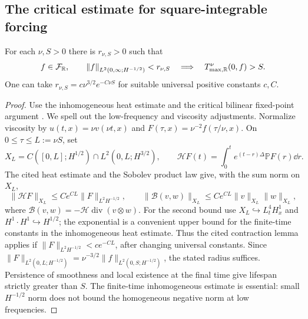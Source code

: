 \subsection{The critical estimate for square-integrable forcing}
\begin{proposition}\label{prop:Rcritical2}
For each $\nu,S>0$ there is $r_{\nu,S}>0$ such that
\[
 f\in\mathcal F_{\mathbb R},\qquad
 \left\lVert f\right\rVert_{L^2(0,\infty;H^{-1/2})}<r_{\nu,S}
 \quad\Longrightarrow\quad T^\nu_{\max,\mathbb R}(0,f)>S.
\]
One can take $r_{\nu,S}=c\nu^{3/2}e^{-C\nu S}$ for suitable universal positive constants $c,C$.
\end{proposition}
\begin{proof}
Use the inhomogeneous heat estimate
\cite[Theorem~2.2.5, p.~44]{danchin} and the critical bilinear fixed-point
argument \cite[Lemma~2.3.2 and the proof of Theorem~2.3.1, pp.~48--49]{danchin}.
We spell out the low-frequency and viscosity adjustments. Normalize viscosity
by $u(t,x)=\nu v(\nu t,x)$ and $F(\tau,x)=\nu^{-2}f(\tau/\nu,x)$.
On $0\le\tau\le L:=\nu S$, set
\[
 X_L=C([0,L];H^{1/2})\cap L^2(0,L;H^{3/2}),
 \qquad
 \mathcal H F(t)=\int_0^t e^{(t-r)\Delta}\mathbb P F(r)\dd r.
\]
The cited heat estimate and the Sobolev product law give, with the sum norm
on $X_L$,
\[
 \|\mathcal H F\|_{X_L}\le Ce^{CL}\|F\|_{L^2H^{-1/2}},\qquad
 \|\mathcal B(v,w)\|_{X_L}\le Ce^{CL}\|v\|_{X_L}\|w\|_{X_L},
\]
where $\mathcal B(v,w)=-\mathcal H\operatorname{div}(v\otimes w)$.
For the second bound use $X_L\hookrightarrow L^4_tH^1_x$ and
$H^1\cdot H^1\hookrightarrow H^{1/2}$; the exponential is a convenient
upper bound for the finite-time constants in the inhomogeneous heat estimate.
Thus the cited contraction lemma applies if
$\|F\|_{L^2H^{-1/2}}<ce^{-CL}$, after changing universal constants.
Since
$\|F\|_{L^2(0,L;H^{-1/2})}=\nu^{-3/2}\|f\|_{L^2(0,S;H^{-1/2})}$,
the stated radius suffices. Persistence of smoothness and local existence
at the final time give lifespan strictly greater than $S$.
The finite-time inhomogeneous estimate is essential: small
$H^{-1/2}$ norm does not bound the homogeneous negative norm at low frequencies.
\end{proof}

